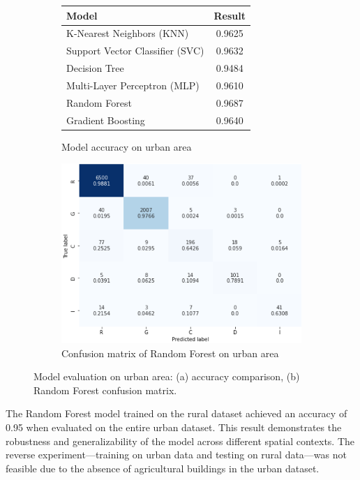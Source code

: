 \documentclass[11pt]{article}
\begin{document}
\begin{figure}[H]
\centering
\begin{subfigure}{0.48\textwidth}
\centering
\begin{tabular}{lc}
\toprule
Model & Result \\
\midrule
K-Nearest Neighbors (KNN) & 0.9625 \\
Support Vector Classifier (SVC) & 0.9632 \\
Decision Tree & 0.9484 \\
Multi-Layer Perceptron (MLP) & 0.9610 \\
Random Forest & 0.9687 \\
Gradient Boosting & 0.9640 \\
\bottomrule
\end{tabular}
\caption{Model accuracy on urban area}
\label{fig:results-urban-table}
\end{subfigure}%
\hfill
\begin{subfigure}{0.48\textwidth}
\centering
\includegraphics[width=\linewidth]{fig8.png}
\caption{Confusion matrix of Random Forest on urban area}
\label{fig:results-urban-confusion}
\end{subfigure}
\caption{Model evaluation on urban area: (a) accuracy comparison, (b) Random Forest confusion matrix.}
\label{fig:results-urban}
\end{figure}





The Random Forest model trained on the rural dataset achieved an accuracy of 0.95 when evaluated on the entire urban dataset. This result demonstrates the robustness and generalizability of the model across different spatial contexts. The reverse experiment—training on urban data and testing on rural data—was not feasible due to the absence of agricultural buildings in the urban dataset.
\end{document}
